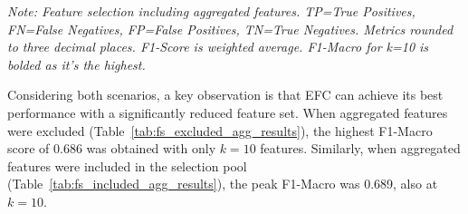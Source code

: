\documentclass[12pt]{article}
\begin{document}
\begin{table}[htbp]
  \centering
  \caption{EFC Performance with Feature Selection (Aggregated Features Included) for Varying k (Experiment 2b).}
  \label{tab:fs_included_agg_results}
  \par\medskip
  \footnotesize
  \textit{Note: Feature selection including aggregated features. TP=True Positives, FN=False Negatives, FP=False Positives,
  TN=True Negatives. Metrics rounded to three decimal places. F1-Score is weighted average. F1-Macro for k=10 is bolded
  as it's the highest.}
\end{table}


Considering both scenarios, a key observation is that EFC can achieve its best performance with a significantly reduced
feature set. When aggregated features were excluded (Table~\ref{tab:fs_excluded_agg_results}), the highest F1-Macro score
of 0.686 was obtained with only $k=10$ features. Similarly, when aggregated features were included in the selection pool
(Table~\ref{tab:fs_included_agg_results}), the peak F1-Macro was 0.689, also at $k=10$.
\end{document}
